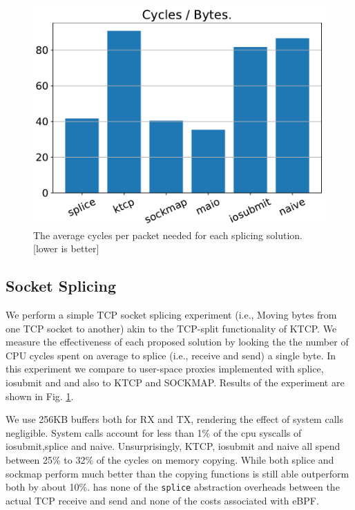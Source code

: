 \begin{figure}[t]
    \centering
    \includegraphics[width=\columnwidth]{splice.pdf}
    \caption{The average cycles per packet needed for each splicing solution. [lower is better]}
    \label{fig:cyc_byte}
\end{figure}

\subsection{Socket Splicing}
We perform a simple TCP socket splicing experiment (i.e., Moving bytes from one TCP socket to another) akin to the TCP-split functionality of KTCP. We measure the effectiveness of each proposed solution by looking the the number of CPU cycles spent on average to splice (i.e., receive and send) a single byte. In this experiment we compare \oursys to user-space proxies implemented with splice\cite{splice}, iosubmit\cite{cloudflare_aio} and \sockets and also to KTCP\cite{ktcp} and SOCKMAP\cite{sockmap}. Results of the experiment are shown in Fig. \ref{fig:cyc_byte}.

We use 256KB buffers both for RX and TX, rendering the effect of system calls negligible. System calls account for less than 1\% of the cpu syscalls of iosubmit,splice and naive. Unsurprisingly, KTCP, iosubmit and naive all spend between 25\% to 32\% of the cycles on memory copying. While both splice and sockmap perform much better than the copying functions \oursys is still able outperform both by about 10\%. \oursys has none of the \texttt{splice} abstraction overheads between the actual TCP receive and send and none of the costs associated with eBPF. 

